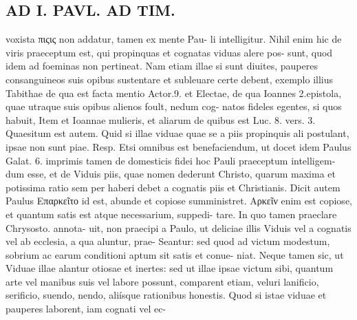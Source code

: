 \documentclass{article}
\begin{document}
\begin{pages}
\section*{AD I. PAVL. AD TIM. }
\marginpar{[ p.302 ]}voxista πιςις non addatur, tamen ex mente Pau- li intelligitur. Nihil enim hic de viris praeceptum est, qui propinquas et cognatas viduas alere pos- sunt, quod idem ad foeminas non pertineat. Nam etiam illae si sunt diuites, pauperes consanguineos suis opibus sustentare et subleuare certe debent, exemplo illius Tabithae de qua est facta mentio Actor.9. et Electae, de qua Ioannes 2.epistola, quae utraque suis opibus alienos foult, nedum cog- natos fideles egentes, si quos habuit, Item et Ioannae mulieris, et aliarum de quibus est Luc. 8. vers. 3. Quaesitum est autem. Quid si illae viduae quae se a piis propinquis ali postulant, ipsae non sunt piae. Resp. Etsi omnibus est benefaciendum, ut docet idem Paulus Galat. 6. imprimis tamen de domesticis fidei hoc Pauli praeceptum intelligem- dum esse, et de Viduis piis, quae nomen dederunt Christo, quarum maxima et potissima ratio sem per haberi debet a cognatis piis et Christianis. Dicit autem Paulus Επαρκεῖτο id est, abunde et copiose sumministret. Αρκεῖν enim est copiose, et quantum satis est atque necessarium, suppedi- tare. In quo tamen praeclare Chrysosto. annota- uit, non praecipi a Paulo, ut deliciae illis Viduis vel a cognatis vel ab ecclesia, a qua aluntur, prae- Seantur: sed quod ad victum modestum, sobrium ac earum conditioni aptum sit satis et conue- niat. Neque tamen sic, ut Viduae illae alantur otiosae et inertes: sed ut illae ipsae victum sibi, quantum arte vel manibus suis vel labore possunt, comparent etiam, veluri lanificio, serificio, suendo, nendo, aliísque rationibus honestis. Quod si istae viduae et pauperes laborent, iam cognati vel ec- 

\end{pages}
\end{document}
